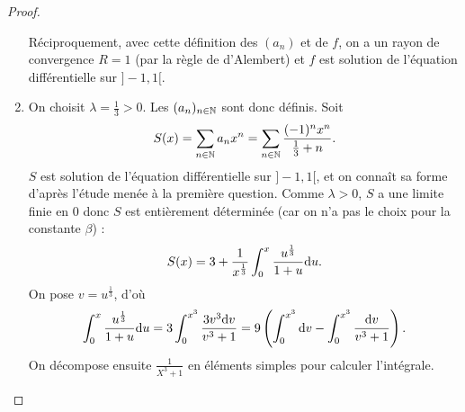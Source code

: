 \documentclass[12pt]{article}
\begin{document}
\begin{proof}
\begin{enumerate}
		Réciproquement, avec cette définition des $(a_n)$ et de $f$, on a un rayon de convergence $R=1$ (par la règle de d'Alembert) et $f$ est solution de l'équation différentielle sur $]-1,1[$.

		\item On choisit $\lambda=\frac{1}{3}>0$. Les $(a_n)_{n\in\mathbb{N}}$ sont donc définis. Soit 
		\begin{equation*}
			S(x)=\sum_{n\in\mathbb{N}}a_nx^{n}=\sum_{n\in\mathbb{N}}\frac{(-1)^{n}x^{n}}{\frac{1}{3}+n}.
		\end{equation*}
		$S$ est solution de l'équation différentielle sur $]-1,1[$, et on connaît sa forme d'après l'étude menée à la première question. Comme $\lambda>0$, $S$ a une limite finie en 0 donc $S$ est entièrement déterminée (car on n'a pas le choix pour la constante $\beta$) :
		\begin{equation*}
			S(x)=3+\frac{1}{x^{\frac{1}{3}}}\int_{0}^{x}\frac{u^{\frac{1}{3}}}{1+u}\mathrm{d} u.
		\end{equation*}
		On pose $v=u^{\frac{1}{3}}$, d'où 
		\begin{equation*}
			\int_{0}^{x}\frac{u^{\frac{1}{3}}}{1+u}\mathrm{d} u=3\int_{0}^{x^{3}}\frac{3v^{3}\mathrm{d} v}{v^{3}+1}=9\left(\int_{0}^{x^{3}}\mathrm{d} v-\int_{0}^{x^{3}}\frac{\mathrm{d} v}{v^{3}+1}\right).
		\end{equation*}
		On décompose ensuite $\frac{1}{X^{3}+1}$ en éléments simples pour calculer l'intégrale.
	\end{enumerate}
\end{proof}
\end{document}
